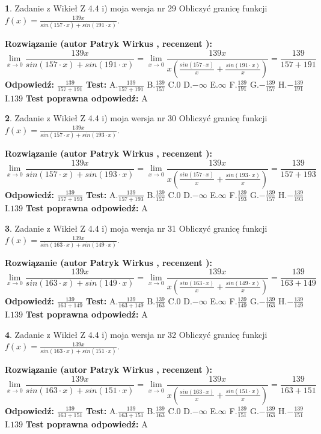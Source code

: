 \documentclass[12pt, a4paper]{article}
\theoremstyle{definition} %
\newtheorem{zad}{}
\newcommand{\zadStart}[1]{\begin{zad}#1\newline}
\newcommand{\zadStop}{\end{zad}}
\newcommand{\rozwStart}[2]{\noindent \textbf{Rozwiązanie (autor #1 , recenzent #2): }\newline}
\newcommand{\rozwStop}{\newline}
\newcommand{\odpStart}{\noindent \textbf{Odpowiedź:}\newline}
\newcommand{\odpStop}{\newline}
\newcommand{\testStart}{\noindent \textbf{Test:}\newline}
\newcommand{\testStop}{\newline}
\newcommand{\kluczStart}{\noindent \textbf{Test poprawna odpowiedź:}\newline}
\newcommand{\kluczStop}{\newline}
\begin{document}
\zadStart{Zadanie z Wikieł Z 4.4 i) moja wersja nr 29}
Obliczyć granicę funkcji $f(x)=\frac{139x}{sin(157\cdot x) +sin(191\cdot x)}$.
\zadStop
\rozwStart{Patryk Wirkus}{}
$$\lim\limits_{x\to 0}\frac{139x}{sin(157\cdot x) +sin(191\cdot x)}=\lim\limits_{x\to 0}\frac{139x}{x(\frac{sin(157\cdot x)}{x}+\frac{sin(191\cdot x)}{x})}=\frac{139}{157+191}$$
\rozwStop
\odpStart
$\frac{139}{157+191}$
\odpStop
\testStart
A.$\frac{139}{157+191}$
B.$\frac{139}{157}$
C.$0$
D.$-\infty$
E.$\infty$
F.$\frac{139}{191}$
G.$-\frac{139}{157}$
H.$-\frac{139}{191}$
I.$139$
\testStop
\kluczStart
A
\kluczStop



\zadStart{Zadanie z Wikieł Z 4.4 i) moja wersja nr 30}
Obliczyć granicę funkcji $f(x)=\frac{139x}{sin(157\cdot x) +sin(193\cdot x)}$.
\zadStop
\rozwStart{Patryk Wirkus}{}
$$\lim\limits_{x\to 0}\frac{139x}{sin(157\cdot x) +sin(193\cdot x)}=\lim\limits_{x\to 0}\frac{139x}{x(\frac{sin(157\cdot x)}{x}+\frac{sin(193\cdot x)}{x})}=\frac{139}{157+193}$$
\rozwStop
\odpStart
$\frac{139}{157+193}$
\odpStop
\testStart
A.$\frac{139}{157+193}$
B.$\frac{139}{157}$
C.$0$
D.$-\infty$
E.$\infty$
F.$\frac{139}{193}$
G.$-\frac{139}{157}$
H.$-\frac{139}{193}$
I.$139$
\testStop
\kluczStart
A
\kluczStop



\zadStart{Zadanie z Wikieł Z 4.4 i) moja wersja nr 31}
Obliczyć granicę funkcji $f(x)=\frac{139x}{sin(163\cdot x) +sin(149\cdot x)}$.
\zadStop
\rozwStart{Patryk Wirkus}{}
$$\lim\limits_{x\to 0}\frac{139x}{sin(163\cdot x) +sin(149\cdot x)}=\lim\limits_{x\to 0}\frac{139x}{x(\frac{sin(163\cdot x)}{x}+\frac{sin(149\cdot x)}{x})}=\frac{139}{163+149}$$
\rozwStop
\odpStart
$\frac{139}{163+149}$
\odpStop
\testStart
A.$\frac{139}{163+149}$
B.$\frac{139}{163}$
C.$0$
D.$-\infty$
E.$\infty$
F.$\frac{139}{149}$
G.$-\frac{139}{163}$
H.$-\frac{139}{149}$
I.$139$
\testStop
\kluczStart
A
\kluczStop



\zadStart{Zadanie z Wikieł Z 4.4 i) moja wersja nr 32}
Obliczyć granicę funkcji $f(x)=\frac{139x}{sin(163\cdot x) +sin(151\cdot x)}$.
\zadStop
\rozwStart{Patryk Wirkus}{}
$$\lim\limits_{x\to 0}\frac{139x}{sin(163\cdot x) +sin(151\cdot x)}=\lim\limits_{x\to 0}\frac{139x}{x(\frac{sin(163\cdot x)}{x}+\frac{sin(151\cdot x)}{x})}=\frac{139}{163+151}$$
\rozwStop
\odpStart
$\frac{139}{163+151}$
\odpStop
\testStart
A.$\frac{139}{163+151}$
B.$\frac{139}{163}$
C.$0$
D.$-\infty$
E.$\infty$
F.$\frac{139}{151}$
G.$-\frac{139}{163}$
H.$-\frac{139}{151}$
I.$139$
\testStop
\kluczStart
A
\kluczStop
\end{document}
